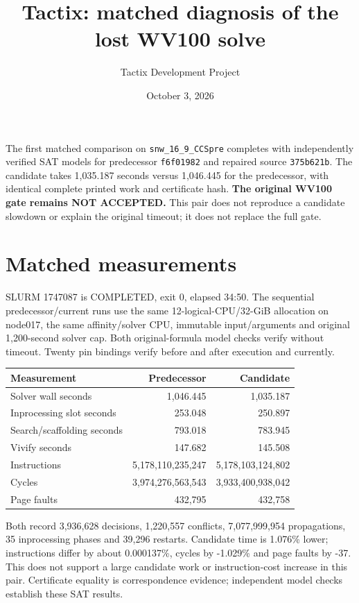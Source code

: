 \documentclass[11pt]{article}
\title{Tactix: matched diagnosis of the lost WV100 solve}
\author{Tactix Development Project}
\date{October 3, 2026}
\begin{document}
\maketitle
The first matched comparison on \texttt{snw\_16\_9\_CCSpre} completes with
independently verified SAT models for predecessor \texttt{f6f01982} and repaired
source \texttt{375b621b}. The candidate takes 1,035.187 seconds versus
1,046.445 for the predecessor, with identical complete printed work and
certificate hash. \textbf{The original WV100 gate remains NOT ACCEPTED.}
This pair does not reproduce a candidate slowdown or explain the original
timeout; it does not replace the full gate.

\section*{Matched measurements}
SLURM 1747087 is COMPLETED, exit 0, elapsed 34:50. The sequential
predecessor/current runs use the same 12-logical-CPU/32-GiB allocation on
node017, the same affinity/solver CPU, immutable input/arguments and original
1,200-second solver cap. Both original-formula model checks verify without
timeout. Twenty pin bindings verify before and after execution and currently.

\begin{center}
\begin{tabular}{lrr}
\toprule
Measurement & Predecessor & Candidate \\
\midrule
Solver wall seconds & 1,046.445 & 1,035.187 \\
Inprocessing slot seconds & 253.048 & 250.897 \\
Search/scaffolding seconds & 793.018 & 783.945 \\
Vivify seconds & 147.682 & 145.508 \\
Instructions & 5,178,110,235,247 & 5,178,103,124,802 \\
Cycles & 3,974,276,563,543 & 3,933,400,938,042 \\
Page faults & 432,795 & 432,758 \\
\bottomrule
\end{tabular}
\end{center}
Both record 3,936,628 decisions, 1,220,557 conflicts, 7,077,999,954
propagations, 35 inprocessing phases and 39,296 restarts. Candidate time is
1.076\% lower; instructions differ by about 0.000137\%, cycles by -1.029\%
and page faults by -37. This does not support a large candidate work or
instruction-cost increase in this pair. Certificate equality is correspondence
evidence; independent model checks establish these SAT results.
\end{document}

